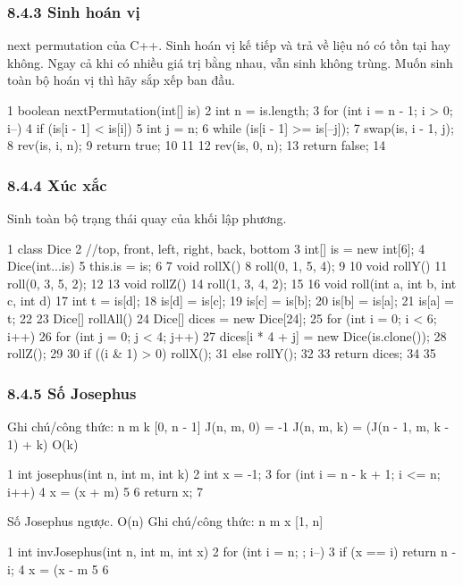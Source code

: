 \documentclass[11pt]{article}
\begin{document}
\subsubsection{8.4.3 Sinh hoán vị}
\begin{NoteBlock}
next permutation của C++.
Sinh hoán vị kế tiếp và trả về liệu nó có tồn tại hay không.
Ngay cả khi có nhiều giá trị bằng nhau, vẫn sinh không trùng.
Muốn sinh toàn bộ hoán vị thì hãy sắp xếp ban đầu.
\end{NoteBlock}
\begin{Code}
1 boolean nextPermutation(int[] is) {
2 int n = is.length;
3 for (int i = n - 1; i > 0; i--) {
4 if (is[i - 1] < is[i]) {
5 int j = n;
6 while (is[i - 1] >= is[--j]);
7 swap(is, i - 1, j);
8 rev(is, i, n);
9 return true;
10 }
11 }
12 rev(is, 0, n);
13 return false;
14 }
\end{Code}
\subsubsection{8.4.4 Xúc xắc}
\begin{NoteBlock}
Sinh toàn bộ trạng thái quay của khối lập phương.
\end{NoteBlock}
\begin{Code}
1 class Dice {
2 //top, front, left, right, back, bottom
3 int[] is = new int[6];
4 Dice(int...is) {
5 this.is = is;
6 }
7 void rollX() {
8 roll(0, 1, 5, 4);
9 }
10 void rollY() {
11 roll(0, 3, 5, 2);
12 }
13 void rollZ() {
14 roll(1, 3, 4, 2);
15 }
16 void roll(int a, int b, int c, int d) {
17 int t = is[d];
18 is[d] = is[c];
19 is[c] = is[b];
20 is[b] = is[a];
21 is[a] = t;
22 }
23 Dice[] rollAll() {
24 Dice[] dices = new Dice[24];
25 for (int i = 0; i < 6; i++) {
26 for (int j = 0; j < 4; j++) {
27 dices[i * 4 + j] = new Dice(is.clone());
28 rollZ();
29 }
30 if ((i & 1) > 0) rollX();
31 else rollY();
32 }
33 return dices;
34 }
35 }
\end{Code}
\subsubsection{8.4.5 Số Josephus}
\begin{NoteBlock}
Ghi chú/công thức: n   m   k   [0, n - 1]
J(n, m, 0) = -1
J(n, m, k) = (J(n - 1, m, k - 1) + k)%
O(k)
\end{NoteBlock}
\begin{Code}
1 int josephus(int n, int m, int k) {
2 int x = -1;
3 for (int i = n - k + 1; i <= n; i++) {
4 x = (x + m) %
5 }
6 return x;
7 }
\end{Code}
\begin{NoteBlock}
Số Josephus ngược.
O(n)
Ghi chú/công thức: n   m   x   [1, n]
\end{NoteBlock}
\begin{Code}
1 int invJosephus(int n, int m, int x) {
2 for (int i = n; ; i--) {
3 if (x == i) return n - i;
4 x = (x - m %
5 }
6 }
\end{Code}
\end{document}
